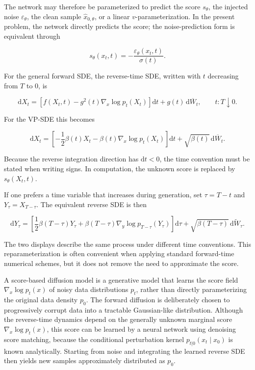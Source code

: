 \documentclass[11pt,a4paper]{article}
\theoremstyle{definition}
\begin{document}
The network may therefore be parameterized to predict the score $s_\theta$, the injected
noise $\varepsilon_\theta$, the clean sample $\widehat{x}_{0,\theta}$, or a linear
$v$-parameterization. In the present problem, the network directly predicts the score;
the noise-prediction form is equivalent through

\[
s_\theta(x_t,t)=-\frac{\varepsilon_\theta(x_t,t)}{\sigma(t)}.
\]

For the general forward SDE, the reverse-time SDE, written with $t$ decreasing from $T$
to $0$, is

\[
\mathrm{d}X_t
=\left[f(X_t,t)-g^2(t)\nabla_x\log p_t(X_t)\right]\mathrm{d}t
+g(t)\,\mathrm{d}\overline{W}_t,
\qquad
t:T\downarrow0.
\]

For the VP-SDE this becomes

\[
\mathrm{d}X_t
=\left[
-\frac12\beta(t)X_t-\beta(t)\nabla_x\log p_t(X_t)
\right]\mathrm{d}t
+\sqrt{\beta(t)}\,\mathrm{d}\overline{W}_t.
\]

Because the reverse integration direction has $\mathrm{d}t<0$, the time convention must
be stated when writing signs. In computation, the unknown score is replaced by
$s_\theta(X_t,t)$.

If one prefers a time variable that increases during generation, set
$\tau=T-t$ and $Y_\tau=X_{T-\tau}$. The equivalent reverse SDE is then

\[
\mathrm{d}Y_\tau
=\left[
\frac12\beta(T-\tau)Y_\tau
+\beta(T-\tau)\nabla_y\log p_{T-\tau}(Y_\tau)
\right]\mathrm{d}\tau
+\sqrt{\beta(T-\tau)}\,\mathrm{d}\widetilde{W}_\tau.
\]

The two displays describe the same process under different time conventions. This
reparameterization is often convenient when applying standard forward-time numerical
schemes, but it does not remove the need to approximate the score.

\begin{remark}
A score-based diffusion model is a generative model that learns the score field $\nabla_x \log p_t(x)$ of noisy data distributions $p_t$, rather than directly parameterizing the original data density $p_0$. The forward diffusion is deliberately chosen to progressively corrupt data into a tractable Gaussian-like distribution. Although the reverse-time dynamics depend on the generally unknown marginal score $\nabla_x \log p_t(x)$, this score can be learned by a neural network using denoising score matching, because the conditional perturbation kernel $p_{t|0}(x_t \mid x_0)$ is known analytically. Starting from noise and integrating the learned reverse SDE then yields new samples approximately distributed as $p_0$.
\end{remark}
\end{document}
